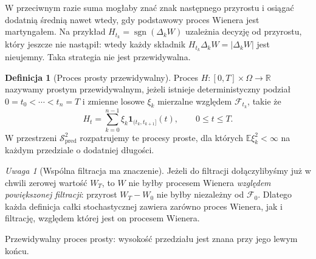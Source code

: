 \documentclass[11pt,a4paper,oneside]{report}
\numberwithin{equation}{chapter}
\theoremstyle{plain}
\theoremstyle{definition}
\newtheorem{definicja}{Definicja}[chapter]
\theoremstyle{remark}
\newtheorem{uwaga}{Uwaga}[chapter]
\newcommand{\R}{\mathbb{R}}
\newcommand{\E}{\mathbb{E}}
\newcommand{\calF}{\mathcal{F}}
\newcommand{\calS}{\mathcal{S}}
\newcommand{\ind}[1]{\mathbf{1}_{#1}}
\begin{document}
W przeciwnym razie suma mogłaby znać znak następnego
przyrostu i osiągać dodatnią średnią nawet wtedy, gdy
podstawowy proces Wienera jest martyngałem. Na przykład
$H_{t_k}=\operatorname{sgn}(\Delta_kW)$
uzależnia decyzję od przyrostu, który jeszcze nie nastąpił:
wtedy każdy składnik $H_{t_k}\Delta_kW=|\Delta_kW|$
jest nieujemny. Taka strategia nie jest przewidywalna.

\begin{definicja}[Proces prosty przewidywalny]\label{def:volIII:02:01}
Proces $H:[0,T]\times\Omega\to\R$ nazywamy prostym
przewidywalnym, jeżeli istnieje deterministyczny podział
$0=t_0<\cdots<t_n=T$ i zmienne losowe $\xi_k$
mierzalne względem $\calF_{t_k}$, takie że
\[
H_t=\sum_{k=0}^{n-1}\xi_k\ind{(t_k,t_{k+1}]}(t),
\qquad 0\le t\le T.
\tag{2.1}\label{eq:ito-step}
\]
W przestrzeni $\calS_{\mathrm{pred}}^2$ rozpatrujemy
te procesy proste, dla których $\E\xi_k^2<\infty$
na każdym przedziale o dodatniej długości.
\end{definicja}

\begin{uwaga}[Wspólna filtracja ma znaczenie]
Jeżeli do filtracji dołączylibyśmy już w chwili zerowej
wartość $W_T$, to $W$ nie byłby procesem Wienera
\emph{względem powiększonej filtracji}: przyrost
$W_T-W_0$ nie byłby niezależny od $\calF_0$.
Dlatego każda definicja całki stochastycznej zawiera
zarówno proces Wienera, jak i filtrację, względem której
jest on procesem Wienera.
\end{uwaga}

\begin{center}
\par\smallskip\small Przewidywalny proces prosty: wysokość przedziału jest znana przy jego lewym końcu.
\end{center}
\end{document}

